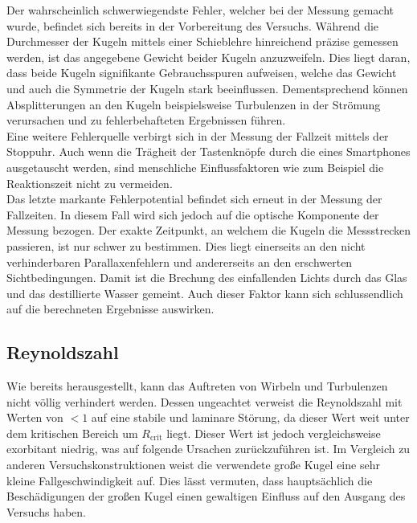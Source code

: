 Der wahrscheinlich schwerwiegendste Fehler, welcher bei der Messung gemacht wurde, befindet sich bereits in der Vorbereitung des 
Versuchs. Während die Durchmesser der Kugeln mittels einer Schieblehre hinreichend präzise gemessen werden, ist das angegebene 
Gewicht beider Kugeln anzuzweifeln. Dies liegt daran, dass beide Kugeln signifikante Gebrauchsspuren aufweisen, welche das Gewicht 
und auch die Symmetrie der Kugeln stark beeinflussen. Dementsprechend können Absplitterungen an den Kugeln beispielsweise Turbulenzen
in der Strömung verursachen und zu fehlerbehafteten Ergebnissen führen.\\
Eine weitere Fehlerquelle verbirgt sich in der Messung der Fallzeit mittels der Stoppuhr. Auch wenn die Trägheit der Tastenknöpfe durch 
die eines Smartphones ausgetauscht werden, sind menschliche Einflussfaktoren wie zum Beispiel die Reaktionszeit nicht zu vermeiden.\\
Das letzte markante Fehlerpotential befindet sich erneut in der Messung der Fallzeiten. In diesem Fall wird sich jedoch auf die 
optische Komponente der Messung bezogen. Der exakte Zeitpunkt, an welchem die Kugeln die Messstrecken passieren, ist nur schwer zu 
bestimmen. Dies liegt einerseits an den nicht verhinderbaren Parallaxenfehlern und andererseits an den erschwerten Sichtbedingungen.
Damit ist die Brechung des einfallenden Lichts durch das Glas und das destillierte Wasser gemeint. Auch dieser Faktor kann sich 
schlussendlich auf die berechneten Ergebnisse auswirken.

\subsection{Reynoldszahl}

Wie bereits herausgestellt, kann das Auftreten von Wirbeln und Turbulenzen nicht völlig verhindert werden. Dessen ungeachtet 
verweist die Reynoldszahl mit Werten von $< 1$ auf eine stabile und laminare Störung, da dieser Wert weit unter dem kritischen 
Bereich um $R_\text{crit}$ liegt. Dieser Wert ist jedoch vergleichsweise exorbitant niedrig, was auf folgende Ursachen zurückzuführen ist.
Im Vergleich zu anderen Versuchskonstruktionen weist die verwendete große Kugel eine sehr kleine Fallgeschwindigkeit auf. Dies lässt 
vermuten, dass hauptsächlich die Beschädigungen der großen Kugel einen gewaltigen Einfluss auf den Ausgang des Versuchs haben.

